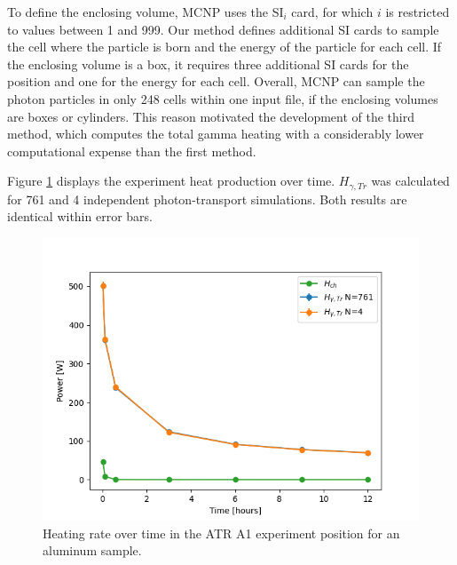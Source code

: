 To define the enclosing volume, MCNP uses the SI$_i$ card, for which $i$ is restricted to values between 1 and 999.
Our method defines additional SI cards to sample the cell where the particle is born and the energy of the particle for each cell.
If the enclosing volume is a box, it requires three additional SI cards for the position and one for the energy for each cell.
Overall, MCNP can sample the photon particles in only 248 cells within one input file, if the enclosing volumes are boxes or cylinders.
This reason motivated the development of the third method, which computes the total gamma heating with a considerably lower computational expense than the first method.

Figure \ref{fig:atr-time2} displays the experiment heat production over time.
$H_{\gamma,Tr}$ was calculated for 761 and 4 independent photon-transport simulations.
Both results are identical within error bars.

\begin{figure}[htbp!] %
    \centering
    \includegraphics[width=0.55\linewidth]{figures/atr-decay-heat-time2}
    \hfill
    \caption{Heating rate over time in the ATR A1 experiment position for an aluminum sample.}
    \label{fig:atr-time2}
\end{figure}
